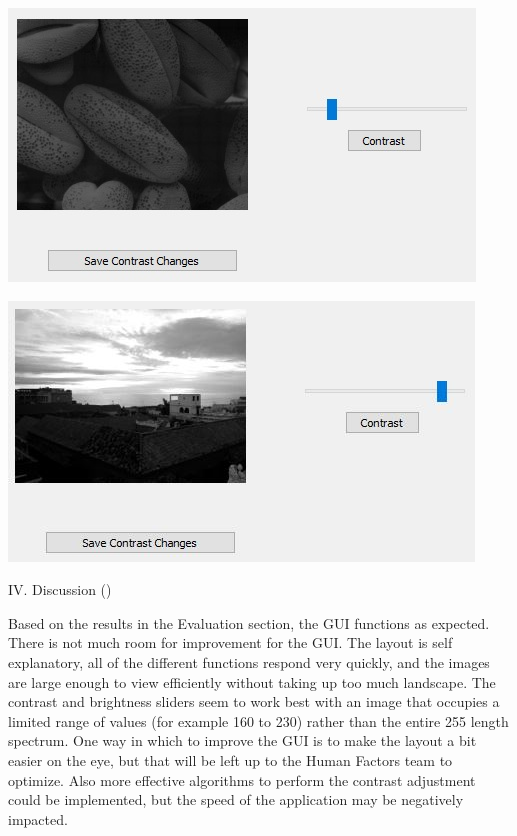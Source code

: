 \documentclass{article}
\newenvironment{Figure}
  {\par\medskip\noindent\ignorespaces\minipage{\linewidth}}
  {\endminipage\par\medskip}
\begin{document}
\begin{multicols*}{2}
\begin{Figure}
 \centering
 \includegraphics[width=\linewidth]{ContrastImage.jpg}
\end{Figure}

\begin{Figure}
 \centering
 \includegraphics[width=\linewidth]{ContrastImage2.jpg}
\end{Figure}


\vspace{15 pt}



\begin{center}
{\large IV. Discussion ()}
\end{center}

Based on the results in the Evaluation section, the GUI functions as expected. There is not much room for improvement for the GUI. The layout is self explanatory, all of the different functions respond very quickly, and the images are large enough to view efficiently without taking up too much landscape. 
The contrast and brightness sliders seem to work best with an image that occupies a limited range of values (for example 160 to 230) rather than the entire 255 length spectrum.
One way in which to improve the GUI is to make the layout a bit easier on the eye, but that will be left up to the Human Factors team to optimize. Also more effective algorithms to perform the contrast adjustment could be implemented, but the speed of the application may be negatively impacted. 


\end{multicols*}
\end{document}
